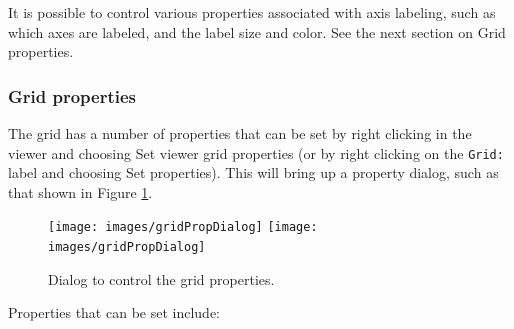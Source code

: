 \documentclass{article}
\begin{document}
It is possible to control various properties associated with
axis labeling, such as which axes are labeled, and the label size and
color. See the next section on {\sf Grid properties}.

\subsubsection{Grid properties}
\label{GridProperties}

The grid has a number of properties that can be set by right clicking
in the viewer and choosing {\sf Set viewer grid properties} (or by
right clicking on the {\tt Grid:} label and choosing {\sf Set
properties}). This will bring up a property dialog, such as that shown
in Figure \ref{GridPropDialog:fig}.

\begin{figure}
\begin{center}
\iflatexml
\texttt{[image: images/gridPropDialog]}
\else
\texttt{[image: images/gridPropDialog]}
\fi
\end{center}
\caption{Dialog to control the grid properties.}%
\label{GridPropDialog:fig}
\end{figure}

Properties that can be set include:
\end{document}
